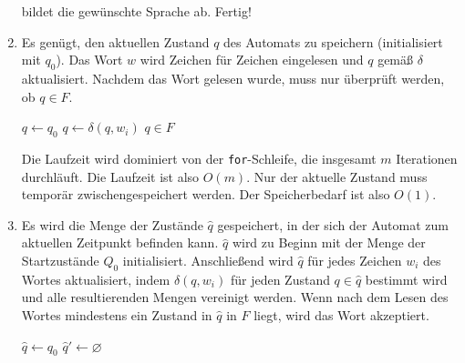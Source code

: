 \documentclass[11pt,a4paper]{article}
\begin{document}
\begin{loesung}
\begin{enumerate}
\begin{figure*}[h!]
        \end{figure*}
        \FloatBarrier
        bildet die gewünschte Sprache ab.
        Fertig!

        \item 
        Es genügt, den aktuellen Zustand $q$ des Automats zu speichern (initialisiert mit $q_0$).
        Das Wort $w$ wird Zeichen für Zeichen eingelesen und $q$ gemäß $\delta$ aktualisiert.
        Nachdem das Wort gelesen wurde, muss nur überprüft werden, ob $q \in F$.
        \begin{algorithmic}[1]
                \State $q \gets q_0$
                    \State $q \gets \delta(q, w_i)$
                \EndFor
                \State \Return $q \in F$
            \EndProcedure
        \end{algorithmic}
        Die Laufzeit wird dominiert von der \texttt{for}-Schleife, die insgesamt $m$ Iterationen durchläuft.
        Die Laufzeit ist also $O(m)$.
        Nur der aktuelle Zustand muss temporär zwischengespeichert werden.
        Der Speicherbedarf ist also $O(1)$.
        \item 
        Es wird die Menge der Zustände $\hat{q}$ gespeichert, in der sich der Automat zum aktuellen Zeitpunkt befinden kann.
        $\hat{q}$ wird zu Beginn mit der Menge der Startzustände $Q_0$ initialisiert.
        Anschließend wird $\hat{q}$ für jedes Zeichen $w_i$ des Wortes aktualisiert, indem $\delta(q, w_i)$ für jeden Zustand $q \in \hat{q}$ bestimmt wird und alle resultierenden Mengen vereinigt werden.
        Wenn nach dem Lesen des Wortes mindestens ein Zustand in $\hat{q}$ in $F$ liegt, wird das Wort akzeptiert.
        \begin{algorithmic}[1]
                \State $\hat{q} \gets q_0$
                    \State $\hat{q}' \gets \varnothing$

\end{algorithmic}
\end{enumerate}
\end{loesung}
\end{document}

